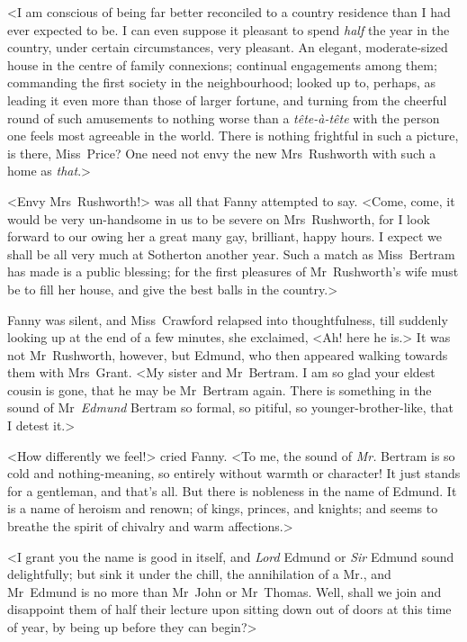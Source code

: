 <I am conscious of being far better reconciled to a country residence than I had ever expected to be. I can even suppose it pleasant to spend \textit{half}  the year in the country, under certain circumstances, very pleasant. An elegant, moderate-sized house in the centre of family connexions; continual engagements among them; commanding the first society in the neighbourhood; looked up to, perhaps, as leading it even more than those of larger fortune, and turning from the cheerful round of such amusements to nothing worse than a \textit{tête-à-tête}  with the person one feels most agreeable in the world. There is nothing frightful in such a picture, is there, Miss~Price? One need not envy the new Mrs~Rushworth with such a home as \textit{that}.>

<Envy Mrs~Rushworth!> was all that Fanny attempted to say. <Come, come, it would be very un-handsome in us to be severe on Mrs~Rushworth, for I look forward to our owing her a great many gay, brilliant, happy hours. I expect we shall be all very much at Sotherton another year. Such a match as Miss~Bertram has made is a public blessing; for the first pleasures of Mr~Rushworth's wife must be to fill her house, and give the best balls in the country.>

Fanny was silent, and Miss~Crawford relapsed into thoughtfulness, till suddenly looking up at the end of a few minutes, she exclaimed, <Ah! here he is.> It was not Mr~Rushworth, however, but Edmund, who then appeared walking towards them with Mrs~Grant. <My sister and Mr~Bertram. I am so glad your eldest cousin is gone, that he may be Mr~Bertram again. There is something in the sound of Mr~\textit{Edmund}  Bertram so formal, so pitiful, so younger-brother-like, that I detest it.>

<How differently we feel!> cried Fanny. <To me, the sound of \textit{Mr.}  Bertram is so cold and nothing-meaning, so entirely without warmth or character! It just stands for a gentleman, and that's all. But there is nobleness in the name of Edmund. It is a name of heroism and renown; of kings, princes, and knights; and seems to breathe the spirit of chivalry and warm affections.>

<I grant you the name is good in itself, and \textit{Lord}  Edmund or \textit{Sir}  Edmund sound delightfully; but sink it under the chill, the annihilation of a Mr., and Mr~Edmund is no more than Mr~John or Mr~Thomas. Well, shall we join and disappoint them of half their lecture upon sitting down out of doors at this time of year, by being up before they can begin?>

